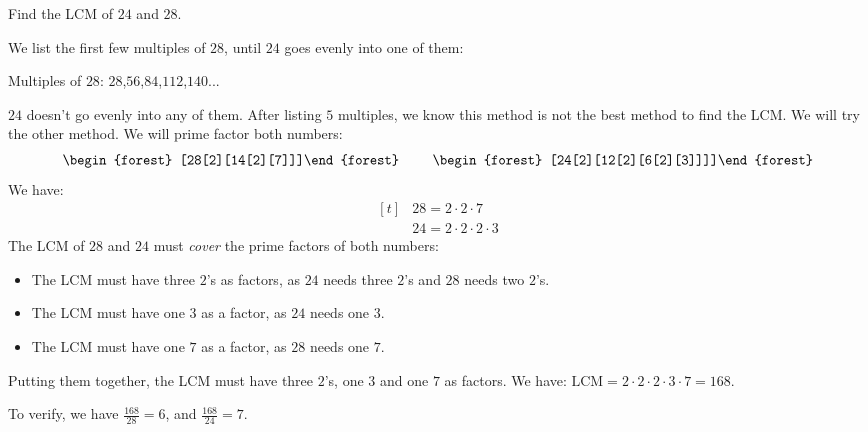 \begin{myexample}
Find the LCM of $24$ and $28$.
\end{myexample}
\begin{solution}
We list the first few multiples of $28$, until $24$ goes evenly into one of them:

Multiples of $28$: $28$,$56$,$84$,$112$,$140$...

$24$ doesn't go evenly into any of them. After listing $5$ multiples, we know this method is not the best method to find the LCM. We will try the other method. We will prime factor both numbers:
\[
\begin{tabular}{ l c r }
  \begin{forest} [28[2][14[2][7]]]\end{forest} &  & \begin{forest} [24[2][12[2][6[2][3]]]]\end{forest} \\
\end{tabular}
\]
We have:
\[
\begin{aligned}[t]
&28=2\cdot2\cdot7 \\
&24=2\cdot2\cdot2\cdot3
\end{aligned}
\]
The LCM of $28$ and $24$ must \textit{cover} the prime factors of both numbers:
\begin{itemize}
\item The LCM must have three $2$'s as factors, as $24$ needs three $2$'s and $28$ needs two $2$'s.
\item The LCM must have one $3$ as a factor, as $24$ needs one $3$.
\item The LCM must have one $7$ as a factor, as $28$ needs one $7$.
\end{itemize}
Putting them together, the LCM must have three $2$'s, one $3$ and one $7$ as factors. We have: $\text{LCM}=2\cdot2\cdot2\cdot3\cdot7=168$.

To verify, we have $\frac{168}{28}=6$, and $\frac{168}{24}=7$.
\end{solution}
